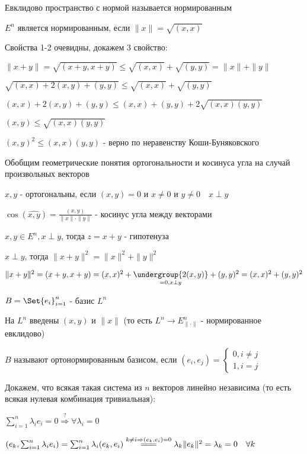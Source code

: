\documentclass[12pt]{article}
\begin{document}
    \hypertarget{normalizedeuclidspace}{}

    Евклидово пространство с нормой называется нормированным

    \begin{MyTheorem}
        \Ths $E^n$ является нормированным, если $\|x\| = \sqrt{(x, x)}$
    \end{MyTheorem}

    \begin{MyProof}
        Свойства 1-2 очевидны, докажем 3 свойство:

        $\|x + y\| = \sqrt{(x + y, x + y)} \leq \sqrt{(x, x)} + \sqrt{(y, y)} = \|x\| + \|y\|$

        $\sqrt{(x, x) + 2(x, y) + (y, y)} \leq \sqrt{(x, x)} + \sqrt{(y, y)}$

        $(x, x) + 2(x, y) + (y, y) \leq (x, x) + (y, y) + 2\sqrt{(x, x)(y, y)}$

        $(x, y) \leq \sqrt{(x, x)(y, y)}$

        $(x, y)^2 \leq (x, x)(y, y)$ - верно по неравенству Коши-Буняковского
    \end{MyProof}

    Обобщим геометрические понятия ортогональности и косинуса угла на случай произвольных векторов

    \Def $x, y$ - ортогональны, если $(x, y) = 0$ и $x \neq 0$ и $y \neq 0 \quad x \perp y$

    \Def $\cos(\widehat{x, y}) = \frac{(x, y)}{\|x\|\cdot\|y\|}$ - косинус угла между векторами

    \Def $x, y \in E^n, x \perp y$, тогда $z = x + y$ - гипотенуза

    \begin{MyTheorem}
        \Ths $x \perp y$, тогда $\|x + y\|^2 = \|x\|^2 + \|y\|^2$
    \end{MyTheorem}

    \begin{MyProof}
        $\|x + y\|^2 = (x + y, x + y) = (x, x)^2 + \underset{= 0, x \perp y}{\undergroup{2(x, y)}} + (y, y)^2 = (x, x)^2 + (y, y)^2$
    \end{MyProof}

    \Def $B = \Set{e_i}_{i=1}^n$ - базис $L^n$

    На $L^n$ введены $(x, y)$ и $\|x\|$ (то есть $L^n \to E^n_{\|\cdot\|}$ - нормированное евклидово)

    \hypertarget{ortonormalizedbasis}{}

    $B$ называют ортонормированным базисом, если $(e_i, e_j) = \begin{cases}0, i \neq j \\ 1, i = j\end{cases}$

    \Nota Докажем, что всякая такая система из $n$ векторов линейно независима (то есть всякая нулевая комбинация тривиальная):

    $\sum_{i=1}^n \lambda_i e_i = 0 \stackrel{?}{\Longrightarrow} \forall \lambda_i = 0$

    $\left(e_k, \sum_{i=1}^n \lambda_i e_i\right) = \sum_{i=1}^n \lambda_i (e_k, e_i) \stackrel{k \neq i \Rightarrow (e_k, e_i) = 0}{=\joinrel=\joinrel=}
    \lambda_k \|e_k\|^2 = \lambda_k = 0 \quad \forall k$
\end{document}
